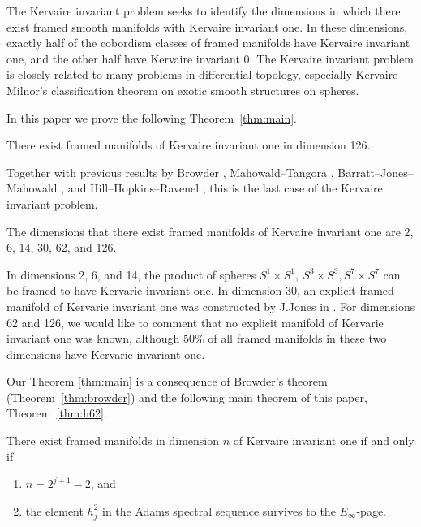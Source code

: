 \documentclass{amsart}
\numberwithin{equation}{section}
\begin{document}
The Kervaire invariant problem seeks to identify the dimensions in which there exist  framed smooth manifolds with Kervaire invariant one. In these dimensions, exactly half of the cobordism classes of framed manifolds have Kervaire invariant one, and the other half have Kervaire invariant 0. The Kervaire invariant problem is closely related to many problems in differential topology, especially Kervaire--Milnor's classification theorem \cite{KervaireMilnor} on exotic smooth structures on spheres. 


In this paper we prove the following Theorem~\ref{thm:main}.

\begin{theorem} \label{thm:main}
    There exist framed manifolds of Kervaire invariant one in dimension 126.
\end{theorem}

Together with previous results by Browder \cite{Browder}, Mahowald--Tangora \cite{MahowaldTangora}, Barratt--Jones--Mahowald \cite{BJMtheta5}, and Hill--Hopkins--Ravenel \cite{HHR}, this is the last case of the Kervaire invariant problem.

\begin{corollary}
  The dimensions that there exist framed manifolds of Kervaire invariant one are 2, 6, 14, 30, 62, and 126.  
\end{corollary}

In dimensions 2, 6, and 14, the product of spheres $S^1 \times S^1, \ S^3 \times S^3, S^7 \times S^7$ can be framed to have Kervarie invariant one.
In dimension 30, an explicit framed manifold of Kervarie invariant one was constructed by J.Jones in \cite{Jones30}. For dimensions 62 and 126, we would like to comment that no explicit manifold of Kervarie invariant one was known, although $50\%$ of all framed manifolds in these two dimensions have Kervarie invariant one.

Our Theorem \ref{thm:main} is a consequence of Browder's theorem (Theorem~\ref{thm:browder}) and the following main theorem of this paper, Theorem~\ref{thm:h62}. 

\begin{theorem} \label{thm:browder}
   There exist framed manifolds in dimension $n$ of Kervaire invariant one if and only if
   \begin{enumerate}
       \item $n=2^{j+1}-2$, and
       \item the element $h_j^2$ in the Adams spectral sequence survives to the $E_\infty$-page.
   \end{enumerate}
\end{theorem}
\end{document}
